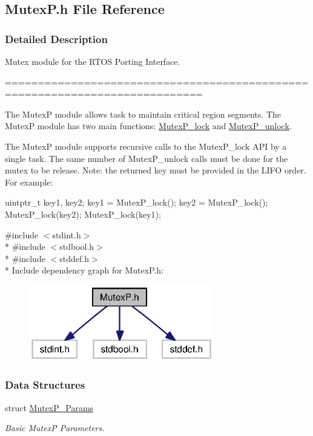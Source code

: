 \subsection{Mutex\+P.\+h File Reference}
\label{_mutex_p_8h}


\subsubsection{Detailed Description}
Mutex module for the R\+T\+O\+S Porting Interface. 

============================================================================

The Mutex\+P module allows task to maintain critical region segments. The Mutex\+P module has two main functions\+: \hyperlink{_mutex_p_8h_a2447ad3ba46c2117235253fc4abb4566}{Mutex\+P\+\_\+lock} and \hyperlink{_mutex_p_8h_a3bb8c88366ec4b5c5903bf0f37924486}{Mutex\+P\+\_\+unlock}.

The Mutex\+P module supports recursive calls to the Mutex\+P\+\_\+lock A\+P\+I by a single task. The same number of Mutex\+P\+\_\+unlock calls must be done for the mutex to be release. Note\+: the returned key must be provided in the L\+I\+F\+O order. For example\+: 
\begin{DoxyCode}
uintptr\_t key1, key2;
key1 = MutexP_lock();
key2 = MutexP_lock();
MutexP_lock(key2);
MutexP_lock(key1);
\end{DoxyCode}
 

{\ttfamily \#include $<$stdint.\+h$>$}\\*
{\ttfamily \#include $<$stdbool.\+h$>$}\\*
{\ttfamily \#include $<$stddef.\+h$>$}\\*
Include dependency graph for Mutex\+P.\+h\+:
\nopagebreak
\begin{figure}[H]
\begin{center}
\leavevmode
\includegraphics[width=229pt]{_mutex_p_8h__incl}
\end{center}
\end{figure}
\subsubsection*{Data Structures}
\begin{DoxyCompactItemize}
\item 
struct \hyperlink{struct_mutex_p___params}{Mutex\+P\+\_\+\+Params}
\begin{DoxyCompactList}\small\item\em Basic Mutex\+P Parameters. \end{DoxyCompactList}\end{DoxyCompactItemize}
